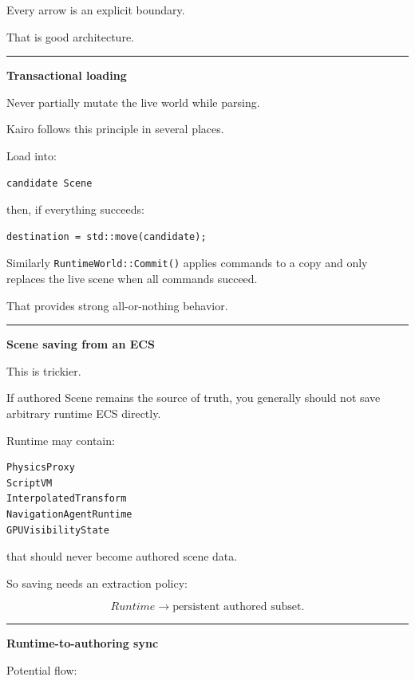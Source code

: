 Every arrow is an explicit boundary.

That is good architecture.

\begin{center}\rule{0.5\linewidth}{0.5pt}\end{center}

\textbf{Transactional loading}

Never partially mutate the live world while parsing.

Kairo follows this principle in several places.

Load into:

\begin{verbatim}
candidate Scene
\end{verbatim}

then, if everything succeeds:

\begin{verbatim}
destination = std::move(candidate);
\end{verbatim}

Similarly \texttt{RuntimeWorld::Commit()} applies commands to a copy and only replaces the live scene when all commands succeed.

That provides strong all-or-nothing behavior.

\begin{center}\rule{0.5\linewidth}{0.5pt}\end{center}

\textbf{Scene saving from an ECS}

This is trickier.

If authored Scene remains the source of truth, you generally should not save arbitrary runtime ECS directly.

Runtime may contain:

\begin{verbatim}
PhysicsProxy
ScriptVM
InterpolatedTransform
NavigationAgentRuntime
GPUVisibilityState
\end{verbatim}

that should never become authored scene data.

So saving needs an extraction policy:

\[
Runtime
\rightarrow
\text{persistent authored subset}.
\]

\begin{center}\rule{0.5\linewidth}{0.5pt}\end{center}

\textbf{Runtime-to-authoring sync}

Potential flow:

